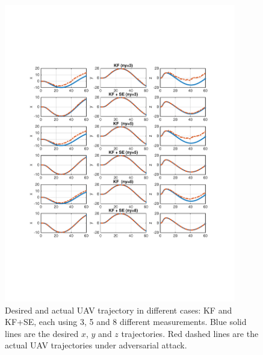 \documentclass[../../thesis.tex]{subfiles}
\begin{document}
\begin{figure}
\center
\includegraphics[width=0.9\textwidth]{chapters/se_linear/figures/qh/uav_lqg_est}
\caption{Desired and actual UAV trajectory in different cases: KF and KF+SE, each using 3, 5 and 8 different measurements. Blue solid lines are the desired $x$, $y$ and $z$ trajectories. Red dashed lines are the actual UAV trajectories under adversarial attack.}
\label{fig:ex_uav_est}
\end{figure}


                                 
\end{document}
